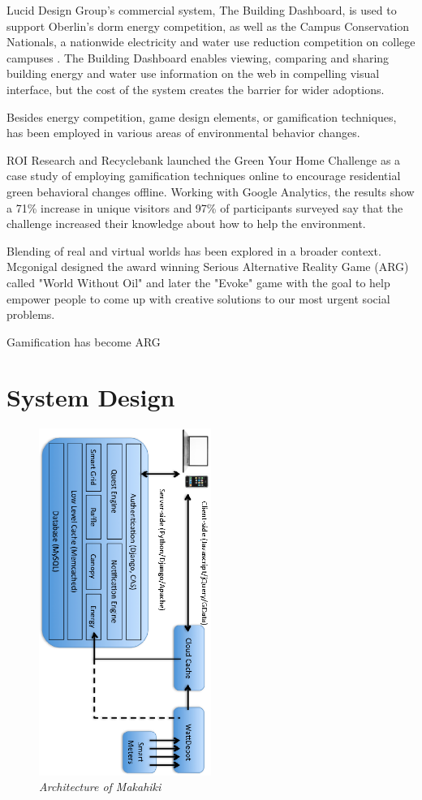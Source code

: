 \documentclass{acm_proc_article-sp}
\begin{document}
Lucid Design Group's commercial system, The Building Dashboard\cite{}, is used to support Oberlin's dorm energy competition, as well as the Campus Conservation Nationals, a nationwide electricity and water use reduction competition on college campuses \cite{}. The Building Dashboard enables viewing, comparing and sharing building energy and water use information on the web in compelling visual interface, but the cost of the system creates the barrier for wider adoptions.

Besides energy competition, game design elements, or gamification techniques, has been employed in various areas of environmental behavior changes. 

ROI Research and Recyclebank launched the Green Your Home Challenge as a case study of employing gamification techniques online to encourage residential green behavioral changes offline\cite{}. Working with Google Analytics, the results show a 71\% increase in unique visitors and 97\% of participants surveyed say that the challenge increased their knowledge about how to help the environment. 

Blending of real and virtual worlds has been explored in a broader context. Mcgonigal designed the award winning Serious Alternative Reality Game (ARG) called "World Without Oil"\cite{} and later the "Evoke"\cite{} game with the goal to help empower people to come up with creative solutions to our most urgent social problems. 

Gamification has become 
ARG

\section{System Design}
\begin{figure}[t!]
  \center
  \includegraphics[width=0.5\textwidth, angle=90]{makahiki-architecture.eps}
  \caption{\em \small Architecture of Makahiki}
  \label{fig:MakahikiArchitecture}
\end{figure}
\end{document}
